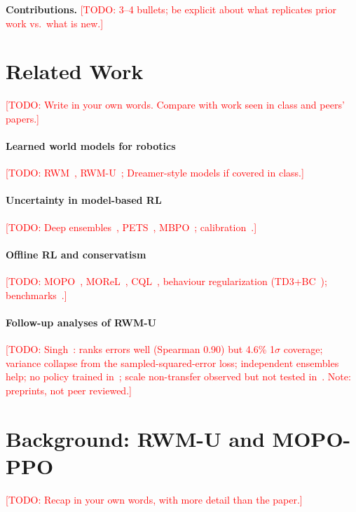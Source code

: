 \documentclass[conference]{IEEEtran}
\newcommand{\todo}[1]{\textcolor{red}{[TODO: #1]}}
\newcommand{\rwmu}{RWM-U}
\begin{document}
\noindent\textbf{Contributions.} \todo{3--4 bullets; be explicit about what replicates prior
work vs.\ what is new.}

\section{Related Work}
\label{sec:related}
\todo{Write in your own words. Compare with work seen in class and peers' papers.}

\paragraph{Learned world models for robotics}
\todo{RWM~\cite{li2025rwm}, \rwmu{}~\cite{li2025rwmu}; Dreamer-style models if covered in class.}

\paragraph{Uncertainty in model-based RL}
\todo{Deep ensembles~\cite{lakshminarayanan2017ensembles}, PETS~\cite{chua2018pets},
MBPO~\cite{janner2019mbpo}; calibration~\cite{kuleshov2018calibrated}.}

\paragraph{Offline RL and conservatism}
\todo{MOPO~\cite{yu2020mopo}, MOReL~\cite{kidambi2020morel}, CQL~\cite{kumar2020cql},
behaviour regularization (TD3+BC~\cite{fujimoto2021td3bc}); benchmarks~\cite{fu2020d4rl,minari}.}

\paragraph{Follow-up analyses of \rwmu{}}
\todo{Singh~\cite{singh2026ranking,singh2026auditing}: ranks errors well (Spearman 0.90) but
4.6\% 1$\sigma$ coverage; variance collapse from the sampled-squared-error loss; independent
ensembles help; no policy trained in~\cite{singh2026ranking}; scale non-transfer observed but not
tested in~\cite{singh2026auditing}. Note: preprints, not peer reviewed.}

\section{Background: \rwmu{} and MOPO-PPO}
\label{sec:method-paper}
\todo{Recap in your own words, with more detail than the paper.}
\end{document}
